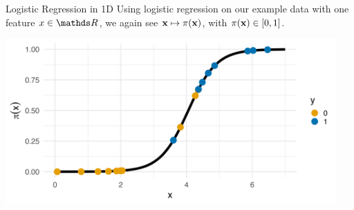 \documentclass[11pt,compress,t,notes=noshow, xcolor=table]{beamer}
\begin{document}
\begin{vbframe}{Logistic Regression in 1D}
Using logistic regression on our example data with one feature $x \in \R$, we again see $\mathbf{x} \mapsto \pi(\mathbf{x})$, with $\pi(\mathbf{x}) \in [0,1]$.

\lz

{\centering \includegraphics[width=0.95\textwidth]{figure/preds_with_probs-logistic.png}
}

\end{vbframe}
\end{document}
